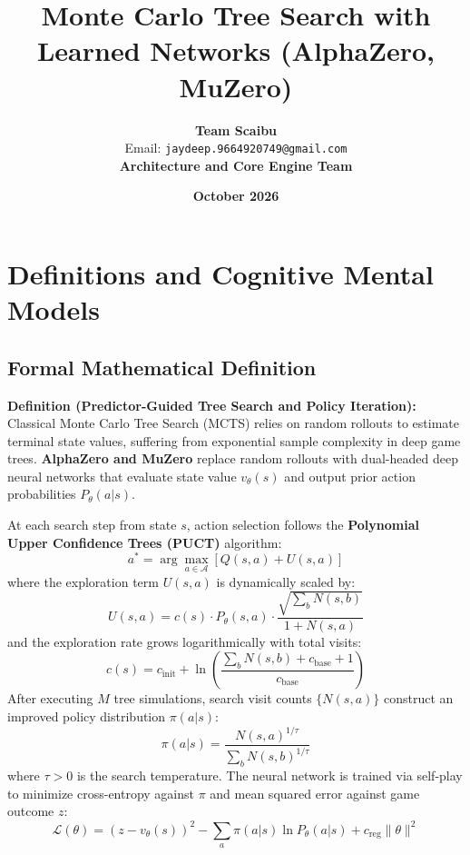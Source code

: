 \documentclass[11pt,a4paper]{article}
\title{\textbf{Monte Carlo Tree Search with Learned Networks (AlphaZero, MuZero)}}
\author{\textbf{Team Scaibu} \\ \small Email: \texttt{jaydeep.9664920749@gmail.com} \\ \small \textbf{Architecture and Core Engine Team}}
\date{\textbf{October 2026}}
\theoremstyle{definition}
\begin{document}
\maketitle

\section{Definitions and Cognitive Mental Models}

\subsection{Formal Mathematical Definition}
\textbf{Definition (Predictor-Guided Tree Search and Policy Iteration):}
Classical Monte Carlo Tree Search (MCTS) relies on random rollouts to estimate terminal state values, suffering from exponential sample complexity in deep game trees. \textbf{AlphaZero and MuZero} replace random rollouts with dual-headed deep neural networks that evaluate state value $v_\theta(s)$ and output prior action probabilities $P_\theta(a | s)$.

At each search step from state $s$, action selection follows the \textbf{Polynomial Upper Confidence Trees (PUCT)} algorithm:
{\boldmath
\begin{equation}
a^* = \arg\max_{a \in \mathcal{A}} \left[ Q(s, a) + U(s, a) \right]
\end{equation}
}
where the exploration term $U(s, a)$ is dynamically scaled by:
{\boldmath
\begin{equation}
U(s, a) = c(s) \cdot P_\theta(s, a) \cdot \frac{\sqrt{\sum_b N(s, b)}}{1 + N(s, a)}
\end{equation}
}
and the exploration rate grows logarithmically with total visits:
{\boldmath
\begin{equation}
c(s) = c_{\text{init}} + \ln\left( \frac{\sum_b N(s, b) + c_{\text{base}} + 1}{c_{\text{base}}} \right)
\end{equation}
}
After executing $M$ tree simulations, search visit counts $\{N(s, a)\}$ construct an improved policy distribution $\pi(a | s)$:
{\boldmath
\begin{equation}
\pi(a | s) = \frac{N(s, a)^{1/\tau}}{\sum_{b} N(s, b)^{1/\tau}}
\end{equation}
}
where $\tau > 0$ is the search temperature. The neural network is trained via self-play to minimize cross-entropy against $\pi$ and mean squared error against game outcome $z$:
{\boldmath
\begin{equation}
\mathcal{L}(\theta) = (z - v_\theta(s))^2 - \sum_{a} \pi(a | s) \ln P_\theta(a | s) + c_{\text{reg}}\|\theta\|^2
\end{equation}
}
\end{document}
